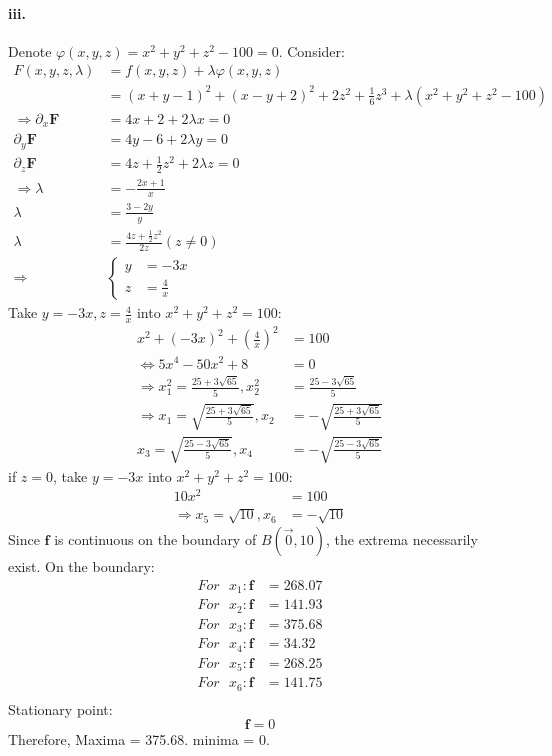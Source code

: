 \documentclass[11pt, a4paper]{article}
\begin{document}
\paragraph{iii.}
Denote $\varphi(x, y, z) = x^2 + y^2 + z^2 - 100 = 0$. Consider:
$$\begin{aligned}
    F(x, y, z, \lambda) &= f(x, y, z) + \lambda\varphi(x, y, z) \\
    &= (x + y - 1)^2 + (x - y + 2)^2 + 2z^2 + \frac{1}{6}z^3 + \lambda(x^2 + y^2 + z^2 - 100) \\
    \Rightarrow \partial_x\bm{F} &= 4x + 2 + 2\lambda x = 0 \\
    \partial_y\bm{F} &= 4y - 6 + 2\lambda y = 0 \\
    \partial_z\bm{F} &= 4z + \frac{1}{2}z^2 + 2\lambda z = 0 \\
    \Rightarrow \lambda &= -\frac{2x + 1}{x} \\
    \lambda &= \frac{3 - 2y}{y} \\
    \lambda &= \frac{4z + \frac{1}{2}z^2}{2z} (z \neq 0)\\
    \Rightarrow
    &\left\{
        \begin{aligned}
            y &= -3x \\
            z &= \frac{4}{x}
        \end{aligned} 
    \right.
\end{aligned}$$
Take $y = -3x, z = \frac{4}{x}$ into $x^2 + y^2 + z^2 = 100$:
$$\begin{aligned}
    x^2 + (-3x)^2 + (\frac{4}{x})^2 &= 100 \\
    \Leftrightarrow 5x^4 -50x^2 + 8 &= 0 \\
    \Rightarrow x^2_1 = \frac{25 + 3\sqrt{65}}{5}, x^2_2 &= \frac{25 - 3\sqrt{65}}{5} \\
    \Rightarrow x_1 = \sqrt{\frac{25 + 3\sqrt{65}}{5}}, x_2 &= -\sqrt{\frac{25 + 3\sqrt{65}}{5}} \\
    x_3 = \sqrt{\frac{25 - 3\sqrt{65}}{5}}, x_4 &= -\sqrt{\frac{25 - 3\sqrt{65}}{5}}
\end{aligned}$$
if $z = 0$, take $y = -3x$ into $x^2 + y^2 + z^2 = 100$:
$$\begin{aligned}
    10x^2 &= 100 \\
    \Rightarrow x_5 = \sqrt{10}, x_6 &= -\sqrt{10}
\end{aligned}$$
Since $\bm{f}$ is continuous on the boundary of $B(\vec{0}, 10)$, the extrema necessarily exist.
On the boundary: 
$$\begin{aligned}
    For\text{ } x_1: \bm{f} &= 268.07\\
    For\text{ } x_2: \bm{f} &= 141.93\\
    For\text{ } x_3: \bm{f} &= 375.68\\
    For\text{ } x_4: \bm{f} &= 34.32\\
    For\text{ } x_5: \bm{f} &= 268.25\\
    For\text{ } x_6: \bm{f} &= 141.75\\
\end{aligned}$$
Stationary point:
$$\bm{f} = 0$$
Therefore, Maxima = 375.68. minima = 0. 
\end{document}
